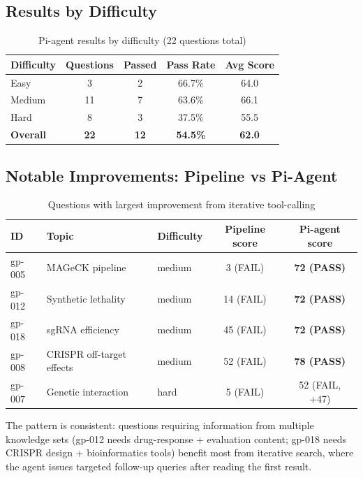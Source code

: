 \documentclass[12pt, a4paper]{article}
\begin{document}
\subsection{Results by Difficulty}

\begin{table}[ht]
\centering
\caption{Pi-agent results by difficulty (22 questions total)}
\begin{tabular}{lcccc}
\toprule
\textbf{Difficulty} & \textbf{Questions} & \textbf{Passed} & \textbf{Pass Rate} & \textbf{Avg Score} \\
\midrule
Easy   & 3  & 2 & 66.7\% & 64.0 \\
Medium & 11 & 7 & 63.6\% & 66.1 \\
Hard   & 8  & 3 & 37.5\% & 55.5 \\
\midrule
\textbf{Overall} & \textbf{22} & \textbf{12} & \textbf{54.5\%} & \textbf{62.0} \\
\bottomrule
\end{tabular}
\end{table}

\subsection{Notable Improvements: Pipeline vs Pi-Agent}

\begin{table}[ht]
\centering
\caption{Questions with largest improvement from iterative tool-calling}
\begin{tabular}{lllcc}
\toprule
\textbf{ID} & \textbf{Topic} & \textbf{Difficulty} & \textbf{Pipeline score} & \textbf{Pi-agent score} \\
\midrule
gp-005 & MAGeCK pipeline           & medium & 3 (FAIL)  & \textbf{72 (PASS)} \\
gp-012 & Synthetic lethality       & medium & 14 (FAIL) & \textbf{72 (PASS)} \\
gp-018 & sgRNA efficiency          & medium & 45 (FAIL) & \textbf{72 (PASS)} \\
gp-008 & CRISPR off-target effects & medium & 52 (FAIL) & \textbf{78 (PASS)} \\
gp-007 & Genetic interaction       & hard   & 5 (FAIL)  & 52 (FAIL, +47) \\
\bottomrule
\end{tabular}
\end{table}

The pattern is consistent: questions requiring information from multiple knowledge sets
(gp-012 needs drug-response + evaluation content; gp-018 needs CRISPR design + bioinformatics
tools) benefit most from iterative search, where the agent issues targeted follow-up queries
after reading the first result.
\end{document}
